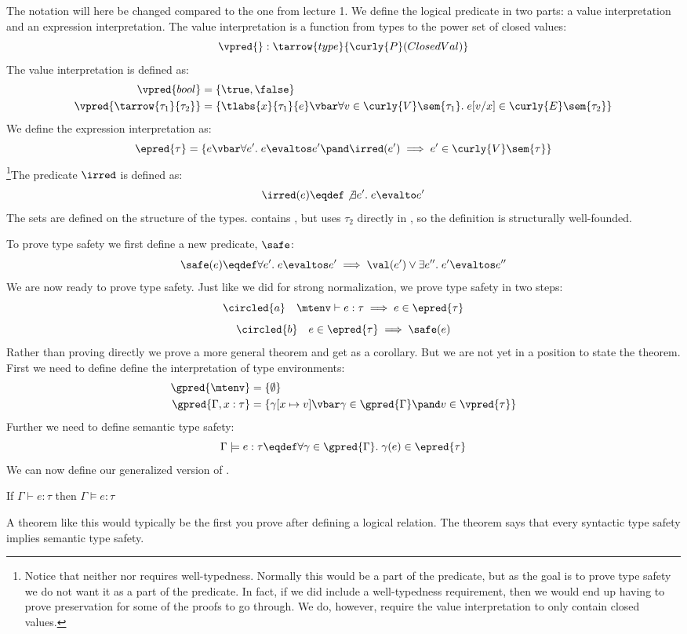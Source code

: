 The notation will here be changed compared to the one from lecture 1. We define the logical predicate in two parts: a value interpretation and an expression interpretation. The value interpretation is a function from types to the power set of closed values:
\[
  \vpred{ } : \tarrow{type}{\curly{P}(ClosedVal)}
\]
The value interpretation is defined as:
\begin{align*}
  \vpred{bool} & = \{ \true, \false \}\\
  \vpred{\tarrow{\tau_1}{\tau_2}} & = \{\tlabs{x}{\tau_1}{e} \vbar \forall v \in \curly{V}\sem{\tau_1}.\; e [v/x] \in \curly{E}\sem{\tau_2}\}
\end{align*}
We define the expression interpretation as:
\[
  \epred{\tau} = \{e \vbar \forall e'. \; e \evaltos e' \pand \irred(e') \implies e' \in \curly{V}\sem{\tau} \}
\]
\footnote{Notice that neither \vpred{\tau} nor \epred{\tau} requires well-typedness. Normally this would be a part of the predicate, but as the goal is to prove type safety we do not want it as a part of the predicate. In fact, if we did include a well-typedness requirement, then we would end up having to prove preservation for some of the proofs to go through. We do, however, require the value interpretation to only contain closed values.}The predicate $\irred$ is defined as:
\[
  \irred(e) \eqdef \not\exists e'. \; e \evalto e'
\]
The sets are defined on the structure of the types.  contains , but  uses $\tau_2$ directly in , so the definition is structurally well-founded. 

To prove type safety we first define a new predicate, $\safe$:
\[
  \safe(e) \eqdef \forall e' . \; e \evaltos e' \implies \val(e') \vee \exists e
''. \; e' \evaltos e''
\]
We are now ready to prove type safety. Just like we did for strong normalization, we prove type safety in two steps:
\[
  \circled{a} \quad \mtenv \vdash e : \tau \implies e \in \epred{\tau}
\]
\[
  \circled{b} \quad e \in \epred{\tau} \implies \safe(e)
\]
Rather than proving  directly we prove a more general theorem and get  as a corollary. But we are not yet in a position to state the theorem. First we need to define define the interpretation of type environments:
\begin{align*}
  \gpred{\mtenv} & = \{ \emptyset \} \\
  \gpred{\Gamma,x:\tau} & = \{\gamma[x \mapsto v] \vbar 
    \gamma \in \gpred{\Gamma} \pand 
    v \in \vpred{\tau}\}
\end{align*}
Further we need to define semantic type safety:
\[
  \Gamma \models e : \tau \eqdef \forall \gamma \in \gpred{\Gamma} . \; \gamma(e) \in \epred{\tau}
\]
We can now define our generalized version of . 
\begin{btypesafety}
  If $\Gamma \vdash e : \tau$ then $\Gamma \models e : \tau$
\end{btypesafety}
A theorem like this would typically be the first you prove after defining a logical relation. The theorem says that every syntactic type safety implies semantic type safety. 

